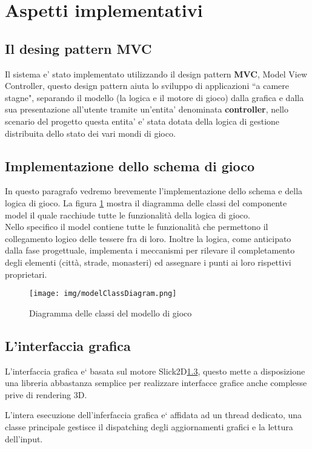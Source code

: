 \section{Aspetti implementativi}



\subsection{Il desing pattern MVC}
Il sistema e' stato implementato utilizzando il design pattern \textbf{MVC},
Model View Controller, questo design pattern aiuta lo sviluppo di applicazioni
``a camere stagne", separando il modello (la logica e il motore di gioco) dalla
grafica e dalla sua presentazione all'utente tramite un'entita' denominata
\textbf{controller}, nello scenario del progetto questa entita' e' stata
dotata della logica di gestione distribuita dello stato dei vari mondi di gioco.

\subsection{Implementazione dello schema di gioco}


In questo paragrafo vedremo brevemente l'implementazione dello schema e
della logica di gioco.
La figura \ref{img:model} mostra il diagramma delle classi del
componente model il quale racchiude tutte le funzionalità della logica
di gioco.\\
Nello specifico il model contiene tutte le funzionalità che permettono
il collegamento logico delle tessere fra di loro. 
Inoltre la logica, come anticipato dalla fase progettuale, implementa i meccanismi per rilevare il completamento degli elementi
(città, strade, monasteri) ed assegnare i punti ai loro rispettivi
proprietari.
\begin{figure}
\texttt{[image: img/modelClassDiagram.png]}
\caption{Diagramma delle classi del modello di gioco}
\label{img:model}
\end{figure}

\subsection{L'interfaccia grafica}
L'interfaccia grafica e` basata sul motore Slick2D\ref{}, %
questo mette a disposizione una libreria abbastanza semplice per realizzare interfacce grafice
anche complesse prive di rendering 3D.

L'intera esecuzione dell'inferfaccia grafica e` affidata ad un thread dedicato, una
classe principale gestisce il dispatching degli aggiornamenti grafici e la lettura
dell'input.

